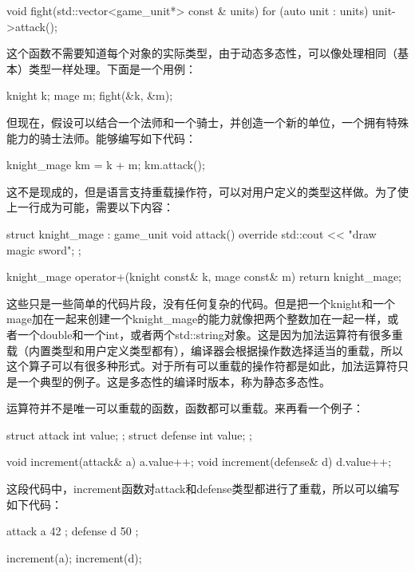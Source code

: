 \begin{cppcode}
void fight(std::vector<game_unit*> const & units)
{
	for (auto unit : units)
	{
		unit->attack();
	}
}
\end{cppcode}

这个函数不需要知道每个对象的实际类型，由于动态多态性，可以像处理相同（基本）类型一样处理。下面是一个用例：

\begin{cppcode}
knight k;
mage m;
fight({&k, &m});
\end{cppcode}

但现在，假设可以结合一个法师和一个骑士，并创造一个新的单位，一个拥有特殊能力的骑士法师。能够编写如下代码：

\begin{cppcode}
knight_mage km = k + m;
km.attack();
\end{cppcode}

这不是现成的，但是语言支持重载操作符，可以对用户定义的类型这样做。为了使上一行成为可能，需要以下内容：

\begin{cppcode}
struct knight_mage : game_unit
{
	void attack() override
	{ std::cout << "draw magic sword\n"; }
};

knight_mage operator+(knight const& k, mage const& m)
{
	return knight_mage{};
}
\end{cppcode}

这些只是一些简单的代码片段，没有任何复杂的代码。但是把一个knight和一个mage加在一起来创建一个knight_mage的能力就像把两个整数加在一起一样，或者一个double和一个int，或者两个std::string对象。这是因为加法运算符有很多重载（内置类型和用户定义类型都有），编译器会根据操作数选择适当的重载，所以这个算子可以有很多种形式。对于所有可以重载的操作符都是如此，加法运算符只是一个典型的例子。这是多态性的编译时版本，称为静态多态性。

运算符并不是唯一可以重载的函数，函数都可以重载。来再看一个例子：

\begin{cppcode}
struct attack { int value; };
struct defense { int value; };

void increment(attack& a) { a.value++; }
void increment(defense& d) { d.value++; }
\end{cppcode}

这段代码中，increment函数对attack和defense类型都进行了重载，所以可以编写如下代码：

\begin{cppcode}
attack a{ 42 };
defense d{ 50 };

increment(a);
increment(d);
\end{cppcode}

